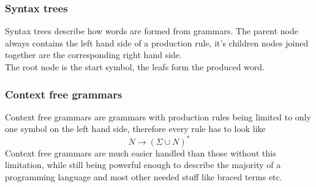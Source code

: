 \documentclass[a4paper]{article}
\begin{document}
\subsubsection*{Syntax trees}
Syntax trees describe how words are formed from grammars. The parent node always contains the left hand side of a production rule, it's children nodes joined together are the corresponding right hand side.\\
The root node is the start symbol, the leafs form the produced word.

\subsubsection*{Context free grammars}
Context free grammars are grammars with production rules being limited to only one symbol on the left hand side, therefore every rule has to look like 
$$N \to (\Sigma\cup N)^* $$
Context free grammars are much easier handled than those without this limitation, while still being powerful enough to describe the majority of a programming language and most other needed stuff like braced terms etc.
\end{document}
